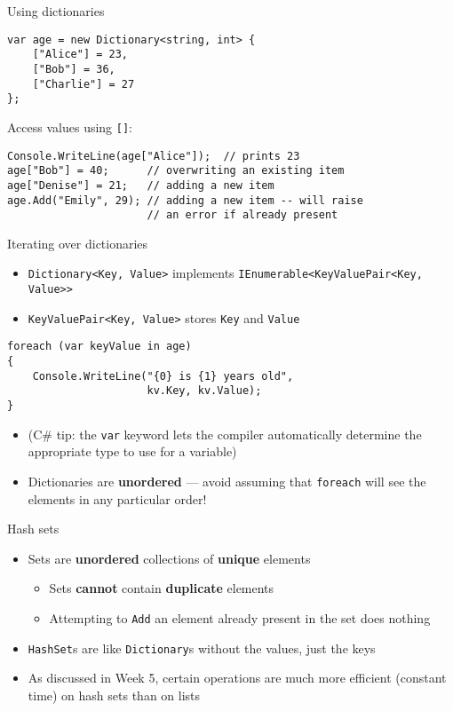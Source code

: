 \begin{frame}[fragile]{Using dictionaries}
	\begin{lstlisting}
var age = new Dictionary<string, int> {
    ["Alice"] = 23,
    ["Bob"] = 36,
    ["Charlie"] = 27
};
	\end{lstlisting}
	\pause Access values using \lstinline{[]}:
	\begin{lstlisting}
Console.WriteLine(age["Alice"]);  // prints 23
age["Bob"] = 40;      // overwriting an existing item
age["Denise"] = 21;   // adding a new item
age.Add("Emily", 29); // adding a new item -- will raise
                      // an error if already present
	\end{lstlisting}
\end{frame}

\begin{frame}[fragile]{Iterating over dictionaries}
	\begin{itemize}
		\pause\item \lstinline{Dictionary<Key, Value>} implements \lstinline{IEnumerable<KeyValuePair<Key, Value>>}
		\pause\item \lstinline{KeyValuePair<Key, Value>} stores \lstinline{Key} and \lstinline{Value}
	\end{itemize}		
	\pause
	\begin{lstlisting}
foreach (var keyValue in age)
{
	Console.WriteLine("{0} is {1} years old",
					  kv.Key, kv.Value);
}
	\end{lstlisting}
	\begin{itemize}
	    \pause\item (C\# tip: the \lstinline{var} keyword lets the compiler automatically determine the appropriate type to use for a variable)
		\pause\item Dictionaries are \textbf{unordered} --- avoid assuming that \lstinline{foreach}
		    will see the elements in any particular order!
	\end{itemize}		
\end{frame}

\begin{frame}{Hash sets}
	\begin{itemize}
		\pause\item Sets are \textbf{unordered} collections of \textbf{unique} elements
            \begin{itemize}
                \pause\item Sets \textbf{cannot} contain \textbf{duplicate} elements
                \pause\item Attempting to \lstinline{Add} an element already present in the set does nothing
            \end{itemize}
		\pause\item \lstinline{HashSet}s are like \lstinline{Dictionary}s without the values, just the keys
		\pause\item As discussed in Week 5, certain operations are much more efficient (constant time) on hash sets than on lists
	\end{itemize}
\end{frame}

